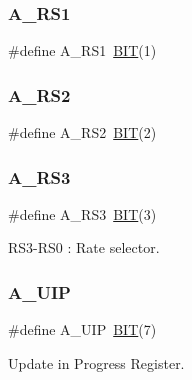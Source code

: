 \hypertarget{group___serial_ga440f99ae843dfc2cab5148ec88d2a80f}{}\label{group___serial_ga440f99ae843dfc2cab5148ec88d2a80f} 
\subsubsection{\texorpdfstring{A\+\_\+\+R\+S1}{A\_RS1}}
{\footnotesize\ttfamily \#define A\+\_\+\+R\+S1~\hyperlink{group___serial_ga3a8ea58898cb58fc96013383d39f482c}{B\+IT}(1)}

\hypertarget{group___serial_ga864ddcec6d5b6652d4157f5519c98b32}{}\label{group___serial_ga864ddcec6d5b6652d4157f5519c98b32} 
\subsubsection{\texorpdfstring{A\+\_\+\+R\+S2}{A\_RS2}}
{\footnotesize\ttfamily \#define A\+\_\+\+R\+S2~\hyperlink{group___serial_ga3a8ea58898cb58fc96013383d39f482c}{B\+IT}(2)}

\hypertarget{group___serial_ga89c395dabf3fb44b1bd163e65e0e113a}{}\label{group___serial_ga89c395dabf3fb44b1bd163e65e0e113a} 
\subsubsection{\texorpdfstring{A\+\_\+\+R\+S3}{A\_RS3}}
{\footnotesize\ttfamily \#define A\+\_\+\+R\+S3~\hyperlink{group___serial_ga3a8ea58898cb58fc96013383d39f482c}{B\+IT}(3)}



R\+S3-\/\+R\+S0 \+: Rate selector. 

\hypertarget{group___serial_ga98e892db8d518077980341c657099508}{}\label{group___serial_ga98e892db8d518077980341c657099508} 
\subsubsection{\texorpdfstring{A\+\_\+\+U\+IP}{A\_UIP}}
{\footnotesize\ttfamily \#define A\+\_\+\+U\+IP~\hyperlink{group___serial_ga3a8ea58898cb58fc96013383d39f482c}{B\+IT}(7)}



Update in Progress Register. 

